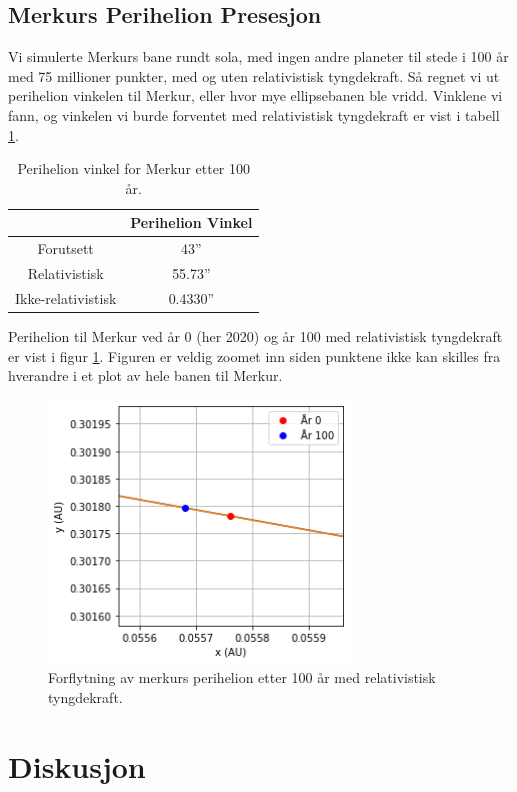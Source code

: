 \documentclass[reprint,english,notitlepage]{revtex4-1}
\begin{document}
\subsection{Merkurs Perihelion Presesjon}
	Vi simulerte Merkurs bane rundt sola, med ingen andre planeter til stede i 100 år med 75 millioner punkter, med og uten relativistisk tyngdekraft. Så regnet vi ut perihelion vinkelen til Merkur, eller hvor mye ellipsebanen ble vridd. Vinklene vi fann, og vinkelen vi burde forventet med relativistisk tyngdekraft\cite{oppgave} er vist i tabell \ref{tab:peri}.
	\begin{table}[H]
		\begin{center}
			\caption{Perihelion vinkel for Merkur etter 100 år.}
			\label{tab:peri}
			\begin{tabular}{|c|c|} \hline
				\textbf{} & \textbf{Perihelion Vinkel} \\ \hline
				Forutsett & 43'' \\
				Relativistisk & 55.73'' \\
				Ikke-relativistisk & 0.4330'' \\ \hline
			\end{tabular}
		\end{center}
	\end{table}
	Perihelion til Merkur ved år 0 (her 2020) og år 100 med relativistisk tyngdekraft er vist i figur \ref{fig:peri}. Figuren er veldig zoomet inn siden punktene ikke kan skilles fra hverandre i et plot av hele banen til Merkur.
	\begin{figure}[H]
		\includegraphics[width=80mm]{../Code/Figures/peri.png}
		\caption{Forflytning av merkurs perihelion etter 100 år med relativistisk tyngdekraft.}
		\label{fig:peri}
	\end{figure}

	
\section{Diskusjon} %
\end{document}
